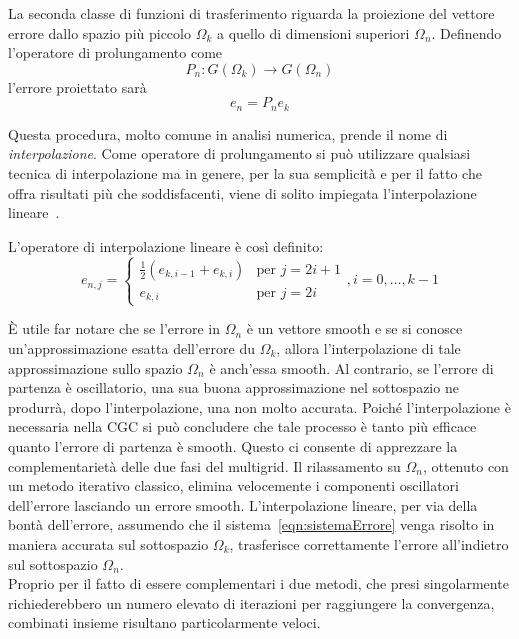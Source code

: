 La seconda classe di funzioni di trasferimento riguarda la proiezione del vettore errore dallo spazio più piccolo $\Omega_k$ a quello di dimensioni superiori $\Omega_n$.
Definendo l'operatore di prolungamento come
\begin{equation*}
P_n : G(\Omega_k) \to G(\Omega_n)
\end{equation*}
l'errore proiettato sarà
\begin{equation*}
e_n = P_n e_k
\end{equation*}

Questa procedura, molto comune in analisi numerica, prende il nome di \emph{interpolazione}.
Come operatore di prolungamento si può utilizzare qualsiasi tecnica di interpolazione ma in genere, per la sua semplicità e per il fatto che offra risultati più che soddisfacenti, viene di solito impiegata l'interpolazione lineare~\cite{MGM_web_tut}.

L'operatore di interpolazione lineare è così definito:
\begin{equation}
e_{n,j} = 
\begin{cases}
\frac{1}{2}(e_{k,i-1} + e_{k,i}) & \text{per } j = 2i +1\\
e_{k,i} & \text{per } j=2i
\end{cases},
i = 0,\dots,k-1
\end{equation}

È utile far notare che se l'errore in $\Omega_n$ è un vettore smooth e se si conosce un'approssimazione esatta dell'errore du $\Omega_k$, allora l'interpolazione di tale approssimazione sullo spazio $\Omega_n$ è anch'essa smooth. Al contrario, se l'errore di partenza è oscillatorio, una sua buona approssimazione nel sottospazio ne produrrà, dopo l'interpolazione, una non molto accurata.
Poiché l'interpolazione è necessaria nella CGC si può concludere che tale processo è tanto più efficace quanto l'errore di partenza è smooth.
Questo ci consente di apprezzare la complementarietà delle due fasi del multigrid.
Il rilassamento su $\Omega_n$, ottenuto con un metodo iterativo classico, elimina velocemente i componenti oscillatori dell'errore lasciando un errore smooth. L'interpolazione lineare, per via della bontà dell'errore, assumendo che il sistema~\eqref{eqn:sistemaErrore} venga risolto in maniera accurata sul sottospazio $\Omega_k$, trasferisce correttamente l'errore all'indietro sul sottospazio $\Omega_n$.\\
Proprio per il fatto di essere complementari i due metodi, che presi singolarmente richiederebbero un numero elevato di iterazioni per raggiungere la convergenza, combinati insieme risultano particolarmente veloci.


